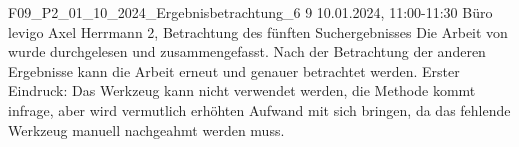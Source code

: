 \fieldnote
{F09\_P2\_01\_10\_2024\_Ergebnisbetrachtung\_6}
{9}
{10.01.2024, 11:00-11:30}
{Büro levigo}
{Axel Herrmann}
{2, Betrachtung des fünften Suchergebnisses}
{
  Die Arbeit von  wurde durchgelesen und zusammengefasst.
}
{
  Nach der Betrachtung der anderen Ergebnisse kann die Arbeit erneut und genauer betrachtet werden.
}
{
}
{}
{
  Erster Eindruck: Das Werkzeug kann nicht verwendet werden, die Methode kommt infrage, aber wird vermutlich erhöhten Aufwand mit sich bringen, da das fehlende Werkzeug manuell nachgeahmt werden muss.
}
